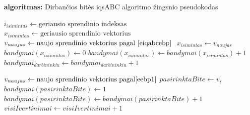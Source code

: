 \documentclass{VUMIFPSmagistrinis}
\begin{document}
\begin{algorithm}[H]
\caption{\textbf{algoritmas:} Dirbančios bitės iqsABC algoritmo žingsnio pseudokodas}
\begin{spacing}{1.0}
\begin{algorithmic}[1]
                \State $i_{isimintas} \gets \text{geriausio sprendinio indeksas} $
                \State $x_{isimintas} \gets  \text{geriausio sprendinio vektorius} $
                \State $v_{naujas} \gets \text{naujo sprendinio vektorius pagal \eqref{eiqabcebp} } $
                    \State $x_{isimintas} \gets v_{naujas}$
                    \State $bandymai(x_{isimintas}) \gets 0$
                \Else
                    \State $bandymai(x_{isimintas}) \gets bandymai(x_{isimintas})+1$
                    \State $bandymai_{darbininkiu} \gets bandymai_{darbininkiu}+1$
                \EndIf
                

            \Else      
                \State $v_{naujas} \gets \text{naujo sprendinio vektorius pagal} \eqref{eebp1}$
                    \State $pasirinktaBite \gets v_{i} $
                    \State $bandymai(pasirinktaBite) \gets 1$
                \Else
                    \State $bandymai(pasirinktaBite) \gets bandymai(pasirinktaBite)+1$
                \EndIf
            \EndIf
        \EndIf
        \State $visiIvertinimai \gets visiIvertinimai + 1$
    \EndFor
\end{algorithmic}
\end{spacing}
\label{alg:2}
\end{algorithm}
\end{document}
